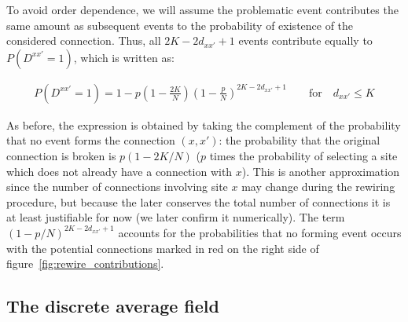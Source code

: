 To avoid order dependence, we will assume the problematic event contributes the same amount as subsequent events to the probability of
existence of the considered connection. Thus, all $2K-2d_{xx'}+1$ events contribute equally to $P(D^{xx'}=1)$, which is written as:

\begin{align}
  P(D^{xx'}=1) = 1 - p\left(1-\frac{2K}{N}\right)\left(1-\frac{p}{N}\right)^{2K - 2d_{xx'} + 1} \qquad \text{for} \quad d_{xx'} \leq K
  \label{eq:probnear}
\end{align}

\noindent As before, the expression is obtained by taking the complement of the probability that no event forms the connection
$(x,x')$: the probability that the original connection is broken is $p(1-2K/N)$ ($p$ times the probability of selecting a site which
does not already have a connection with $x$). This is another approximation since the number of connections involving site $x$ may
change during the rewiring procedure, but because the later conserves the total number of connections it is at least justifiable for
now (we later confirm it numerically). The term $(1-p/N)^{2K-2d_{xx'}+1}$ accounts for the probabilities that no forming event occurs
with the potential connections marked in {\color{red}red} on the right side of figure~\ref{fig:rewire_contributions}.

\subsection{The discrete average field}
\label{subsection:justifyapproximations}


